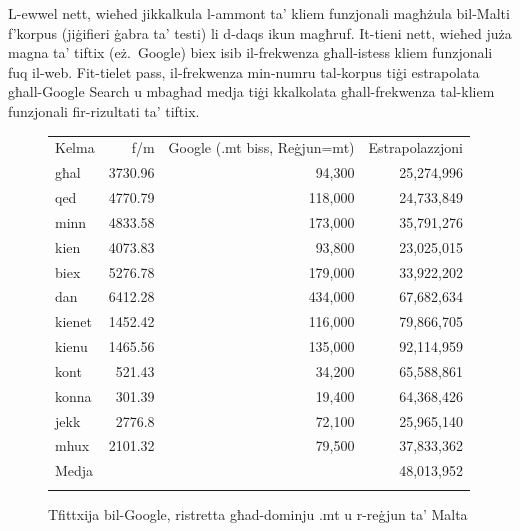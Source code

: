 \begin{multicols}{2}

L-ewwel nett, wieħed jikkalkula l-ammont ta’ kliem funzjonali magħżula bil-Malti f’korpus (jiġifieri ġabra ta’ testi) li d-daqs ikun magħruf. It-tieni nett, wieħed juża magna ta’ tiftix (eż.~Google) biex isib il-frekwenza għall-istess kliem funzjonali fuq il-web. Fit-tielet pass, il-frekwenza min-numru tal-korpus tiġi estrapolata għall-Google Search u mbagħad medja tiġi kkalkolata għall-frekwenza tal-kliem funzjonali fir-rizultati ta’ tiftix.

\begin{figure}[p]
\setlength{\tabcolsep}{2.5em}
\begin{tabularx}{\textwidth}{lrrr} \toprule\addlinespace
Kelma  & f/m & Google (.mt biss, Reġjun=mt) & Estrapolazzjoni  \\ \addlinespace\midrule
għal & 3730.96 & 94,300 & 25,274,996 \\
qed	& 4770.79 & 118,000 & 24,733,849 \\
minn & 4833.58 & 173,000 & 35,791,276 \\
kien & 4073.83 & 93,800 & 23,025,015 \\
biex & 5276.78 & 179,000 & 33,922,202 \\
dan	& 6412.28 & 434,000 & 67,682,634 \\
kienet & 1452.42 & 116,000 & 79,866,705 \\
kienu & 1465.56 & 135,000 & 92,114,959 \\
kont & 521.43 & 34,200 & 65,588,861 \\
konna & 301.39 & 19,400 & 64,368,426 \\
jekk & 2776.8 & 72,100 & 25,965,140 \\
mhux & 2101.32 & 79,500 & 37,833,362 \\ \addlinespace\midrule
Medja & & & 48,013,952 \\ \addlinespace\bottomrule
\end{tabularx}
\caption{Tfittxija bil-Google, ristretta għad-dominju .mt u r-reġjun ta’ Malta}
\label{table:Google_A_mt}
\end{figure}


\end{multicols}
